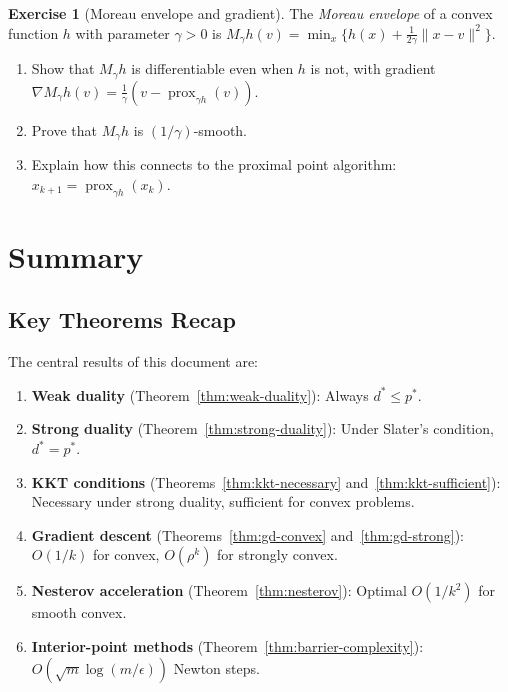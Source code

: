 \documentclass[11pt,a4paper]{article}
\theoremstyle{definition}
\newtheorem{exercise}{Exercise}[section]
\theoremstyle{plain}
\theoremstyle{remark}
\DeclareMathOperator{\prox}{prox}
\begin{document}
\begin{exercise}[Moreau envelope and gradient]\label{ex:moreau}
The \emph{Moreau envelope} of a convex function $h$ with parameter $\gamma > 0$ is
$M_\gamma h(v) = \min_x \{h(x) + \frac{1}{2\gamma}\|x - v\|^2\}$.
\begin{enumerate}[label=(\alph*)]
  \item Show that $M_\gamma h$ is differentiable even when $h$ is not, with
    gradient $\nabla M_\gamma h(v) = \frac{1}{\gamma}(v - \prox_{\gamma h}(v))$.
  \item Prove that $M_\gamma h$ is $(1/\gamma)$-smooth.
  \item Explain how this connects to the proximal point algorithm:
    $x_{k+1} = \prox_{\gamma h}(x_k)$.
\end{enumerate}
\end{exercise}

\section{Summary}\label{sec:summary}

\subsection{Key Theorems Recap}

The central results of this document are:
\begin{enumerate}
  \item \textbf{Weak duality} (Theorem~\ref{thm:weak-duality}): Always
    $d^* \le p^*$.
  \item \textbf{Strong duality} (Theorem~\ref{thm:strong-duality}): Under
    Slater's condition, $d^* = p^*$.
  \item \textbf{KKT conditions} (Theorems~\ref{thm:kkt-necessary}
    and~\ref{thm:kkt-sufficient}): Necessary under strong duality, sufficient
    for convex problems.
  \item \textbf{Gradient descent} (Theorems~\ref{thm:gd-convex}
    and~\ref{thm:gd-strong}): $O(1/k)$ for convex, $O(\rho^k)$ for strongly convex.
  \item \textbf{Nesterov acceleration} (Theorem~\ref{thm:nesterov}): Optimal
    $O(1/k^2)$ for smooth convex.
  \item \textbf{Interior-point methods} (Theorem~\ref{thm:barrier-complexity}):
    $O(\sqrt{m}\log(m/\epsilon))$ Newton steps.
\end{enumerate}
\end{document}
